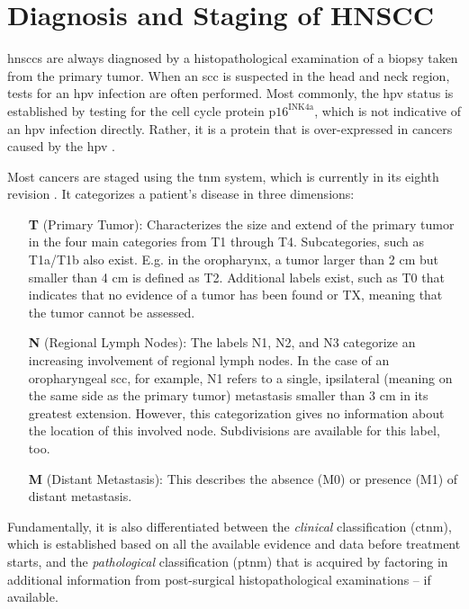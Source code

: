 \documentclass[\relativeRoot/main.tex]{subfiles}
\begin{document}
\section{Diagnosis and Staging of HNSCC}
\label{sec:intro:diagnosis}

\Glspl{hnscc} are always diagnosed by a histopathological examination of a biopsy taken from the primary tumor. When an \gls{scc} is suspected in the head and neck region, tests for an \gls{hpv} infection are often performed. Most commonly, the \gls{hpv} status is established by testing for the cell cycle protein $\text{p16}^\text{INK4a}$, which is not indicative of an \gls{hpv} infection directly. Rather, it is a protein that is over-expressed in cancers caused by the \acrlong{hpv} \cite{johnson_head_2020}.

Most cancers are staged using the \gls{tnm} system, which is currently in its eighth revision \cite{brierley_tnm_2017}. It categorizes a patient's disease in three dimensions:

\begin{enumerate}
    \item[\textbf{T}] (Primary Tumor): Characterizes the size and extend of the primary tumor in the four main categories from T1 through T4. Subcategories, such as T1a/T1b also exist. E.g. in the oropharynx, a tumor larger than 2 cm but smaller than 4 cm is defined as T2. Additional labels exist, such as T0 that indicates that no evidence of a tumor has been found or TX, meaning that the tumor cannot be assessed.
    \item[\textbf{N}] (Regional Lymph Nodes): The labels N1, N2, and N3 categorize an increasing involvement of regional lymph nodes. In the case of an oropharyngeal \gls{scc}, for example, N1 refers to a single, ipsilateral (meaning on the same side as the primary tumor) metastasis smaller than 3 cm in its greatest extension. However, this categorization gives no information about the location of this involved node. Subdivisions are available for this label, too.
    \item[\textbf{M}] (Distant Metastasis): This describes the absence (M0) or presence (M1) of distant metastasis.
\end{enumerate}

Fundamentally, it is also differentiated between the \emph{clinical} classification (c\gls{tnm}), which is established based on all the available evidence and data before treatment starts, and the \emph{pathological} classification (p\gls{tnm}) that is acquired by factoring in additional information from post-surgical histopathological examinations -- if available.
\end{document}

